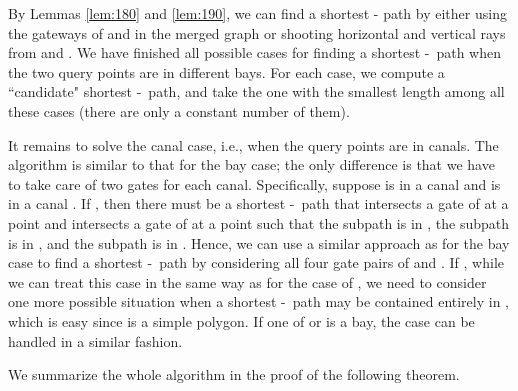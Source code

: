 \documentclass[english,runningheads,11pt]{llncs}
\def\st{-}
\begin{document}
By Lemmas \ref{lem:180} and \ref{lem:190}, we can find a shortest
- path by either using the gateways of  and
 in the merged graph
 or shooting horizontal and vertical rays from
 and . We have finished all possible cases for finding a
shortest \st\ path when the two query points are in different bays.
For each case, we compute a ``candidate" shortest \st\ path, and take
the one with the smallest length among all these cases (there are only a
constant number of them).

It remains to solve the canal case, i.e., when the query points are
in canals. The algorithm is similar to that for the bay case; the only
difference is that we have to take care of two gates for each
canal. Specifically, suppose  is in a canal  and  is
in a canal . If , then there must be a shortest \st\ path
 that intersects a gate of  at a point  and intersects a gate of
 at a point  such that the subpath  is in ,
the subpath  is in , and the subpath 
is in . Hence, we can use a similar approach as for the bay case to
find a shortest \st\ path by considering all four gate pairs of  and
. If , while we can treat this case in the same way as for
the case of , we need to consider one more possible situation when
a shortest \st\ path may be contained entirely in , which is easy since 
is a simple polygon. If one of  or  is a bay, the case can be handled
in a similar fashion.

We summarize the whole algorithm in the proof of the following theorem.
\end{document}
